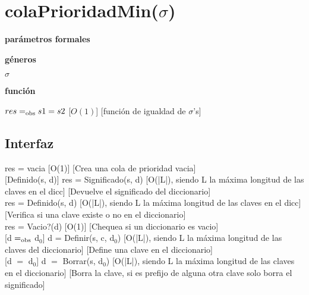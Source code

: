 \section{colaPrioridadMin($\sigma$)}

\textbf{parámetros formales}\parindent\\
\parbox{1.7cm}{\textbf{géneros}}  $\sigma$\\
\parbox[t]{1.7cm}{\textbf{función}}\parbox[t]{\textwidth-2\parindent-1.7cm}{%
{$res =_{\mathrm{obs}} s1 = s2$}
[$O(1)$]
[función de igualdad de $\sigma$'s]
}

\subsection{Interfaz}

{res = vacia}
[O(1)]
[Crea una cola de prioridad vacia]\\

[Definido(s, d)]
{res = Significado(s, d)}
[O(|L|), siendo L la máxima longitud de las claves en el dicc]
[Devuelve el significado del diccionario]\\

{res = Definido(s, d)}
[O(|L|), siendo L la máxima longitud de las claves en el dicc]
[Verifica si una clave existe o no en el diccionario]\\

{res = Vacio?(d)}
[O(1)]
[Chequea si un diccionario es vacio]\\

[d $=_{\mathrm{obs}}$ d$_0$]
{d = Definir(s, c, d$_0$)}
[O(|L|), siendo L la máxima longitud de las claves del diccionario]
[Define una clave en el diccionario]\\

[d $=$ d$_0$]
{d $=$ Borrar(s, d$_0$)}
[O(|L|), siendo L la máxima longitud de las claves en el diccionario]
[Borra la clave, si es prefijo de alguna otra clave solo borra el significado]

